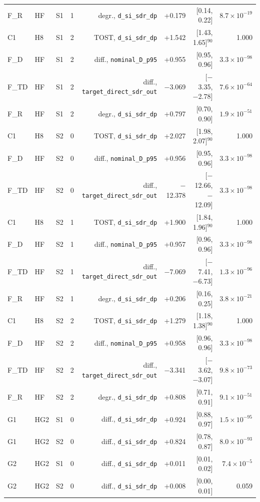 \begin{longtable}{@{}llllrrrr@{}}
F\_R & HF & S1 & 1 & degr., \texttt{d\_si\_sdr\_dp} & +0.179 & [0.14, 0.22] & $8.7\times10^{-19}$ \\
C1 & H8 & S1 & 2 & TOST, \texttt{d\_si\_sdr\_dp} & +1.542 & [1.43, 1.65]$^{90}$ & 1.000 \\
F\_D & HF & S1 & 2 & diff., \texttt{nominal\_D\_p95} & +0.955 & [0.95, 0.96] & $3.3\times10^{-98}$ \\
F\_TD & HF & S1 & 2 & diff., \texttt{target\_direct\_sdr\_out} & $-$3.069 & [$-$3.35, $-$2.78] & $7.6\times10^{-64}$ \\
F\_R & HF & S1 & 2 & degr., \texttt{d\_si\_sdr\_dp} & +0.797 & [0.70, 0.90] & $1.9\times10^{-51}$ \\
C1 & H8 & S2 & 0 & TOST, \texttt{d\_si\_sdr\_dp} & +2.027 & [1.98, 2.07]$^{90}$ & 1.000 \\
F\_D & HF & S2 & 0 & diff., \texttt{nominal\_D\_p95} & +0.956 & [0.95, 0.96] & $3.3\times10^{-98}$ \\
F\_TD & HF & S2 & 0 & diff., \texttt{target\_direct\_sdr\_out} & $-$12.378 & [$-$12.66, $-$12.09] & $3.3\times10^{-98}$ \\
C1 & H8 & S2 & 1 & TOST, \texttt{d\_si\_sdr\_dp} & +1.900 & [1.84, 1.96]$^{90}$ & 1.000 \\
F\_D & HF & S2 & 1 & diff., \texttt{nominal\_D\_p95} & +0.957 & [0.96, 0.96] & $3.3\times10^{-98}$ \\
F\_TD & HF & S2 & 1 & diff., \texttt{target\_direct\_sdr\_out} & $-$7.069 & [$-$7.41, $-$6.73] & $1.3\times10^{-96}$ \\
F\_R & HF & S2 & 1 & degr., \texttt{d\_si\_sdr\_dp} & +0.206 & [0.16, 0.25] & $3.8\times10^{-21}$ \\
C1 & H8 & S2 & 2 & TOST, \texttt{d\_si\_sdr\_dp} & +1.279 & [1.18, 1.38]$^{90}$ & 1.000 \\
F\_D & HF & S2 & 2 & diff., \texttt{nominal\_D\_p95} & +0.958 & [0.96, 0.96] & $3.3\times10^{-98}$ \\
F\_TD & HF & S2 & 2 & diff., \texttt{target\_direct\_sdr\_out} & $-$3.341 & [$-$3.62, $-$3.07] & $9.8\times10^{-73}$ \\
F\_R & HF & S2 & 2 & degr., \texttt{d\_si\_sdr\_dp} & +0.808 & [0.71, 0.91] & $9.1\times10^{-51}$ \\
G1 & HG2 & S1 & 0 & diff., \texttt{d\_si\_sdr\_dp} & +0.924 & [0.88, 0.97] & $1.5\times10^{-95}$ \\
G1 & HG2 & S2 & 0 & diff., \texttt{d\_si\_sdr\_dp} & +0.824 & [0.78, 0.87] & $8.0\times10^{-93}$ \\
G2 & HG2 & S1 & 0 & diff., \texttt{d\_si\_sdr\_dp} & +0.011 & [0.01, 0.02] & $7.4\times10^{-5}$ \\
G2 & HG2 & S2 & 0 & diff., \texttt{d\_si\_sdr\_dp} & +0.008 & [0.00, 0.01] & 0.059 \\
\bottomrule
\end{longtable}
